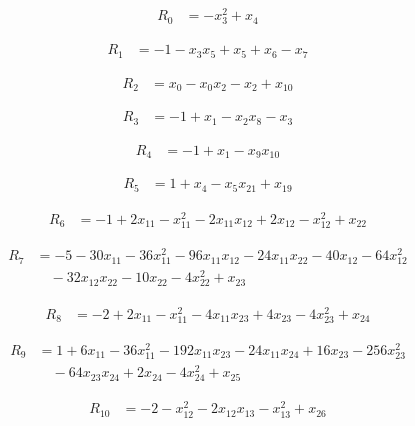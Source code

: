 \begin{align*}
R_{0} &= -x_{3}^{2} +x_{4}
\end{align*}

\begin{align*}
R_{1} &= -1 -x_{3} x_{5} +x_{5} +x_{6} -x_{7}
\end{align*}

\begin{align*}
R_{2} &= x_{0} -x_{0} x_{2} -x_{2} +x_{10}
\end{align*}

\begin{align*}
R_{3} &= -1 +x_{1} -x_{2} x_{8} -x_{3}
\end{align*}

\begin{align*}
R_{4} &= -1 +x_{1} -x_{9} x_{10}
\end{align*}

\begin{align*}
R_{5} &= 1 +x_{4} -x_{5} x_{21} +x_{19}
\end{align*}

\begin{align*}
R_{6} &= -1 +2 x_{11} -x_{11}^{2} -2 x_{11} x_{12} +2 x_{12} -x_{12}^{2} +x_{22}
\end{align*}

\begin{align*}
R_{7} &= -5 -30 x_{11} -36 x_{11}^{2} -96 x_{11} x_{12} -24 x_{11} x_{22} -40 x_{12} -64 x_{12}^{2} \\
&\quad -32 x_{12} x_{22} -10 x_{22} -4 x_{22}^{2} +x_{23}
\end{align*}

\begin{align*}
R_{8} &= -2 +2 x_{11} -x_{11}^{2} -4 x_{11} x_{23} +4 x_{23} -4 x_{23}^{2} +x_{24}
\end{align*}

\begin{align*}
R_{9} &= 1 +6 x_{11} -36 x_{11}^{2} -192 x_{11} x_{23} -24 x_{11} x_{24} +16 x_{23} -256 x_{23}^{2} \\
&\quad -64 x_{23} x_{24} +2 x_{24} -4 x_{24}^{2} +x_{25}
\end{align*}

\begin{align*}
R_{10} &= -2 -x_{12}^{2} -2 x_{12} x_{13} -x_{13}^{2} +x_{26}
\end{align*}

